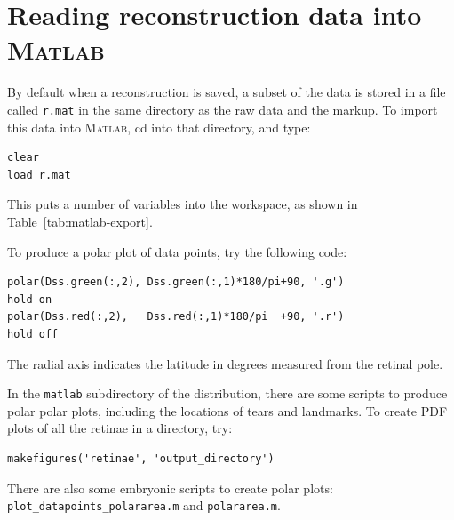 \documentclass{book}
\begin{document}
\section{Reading reconstruction data into \textsc{Matlab}}
\label{retistruct-manual:sec:export-reconstr-data}

By default when a reconstruction is saved, a subset of the data is
stored in a file called \texttt{r.mat} in the same directory as the
raw data and the markup. To import this data into \textsc{Matlab}, cd
into that directory, and type:
\begin{verbatim}
clear
load r.mat
\end{verbatim}
This puts a number of variables into the workspace, as shown in
Table~\ref{tab:matlab-export}.

To produce a polar plot of data points, try the following code:
\begin{verbatim}
polar(Dss.green(:,2), Dss.green(:,1)*180/pi+90, '.g')
hold on
polar(Dss.red(:,2),   Dss.red(:,1)*180/pi  +90, '.r')
hold off
\end{verbatim}
The radial axis indicates the latitude in degrees measured from the
retinal pole.

In the \texttt{matlab} subdirectory of the distribution, there are
some scripts to produce polar polar plots, including the locations of
tears and landmarks. To create PDF plots of all the retinae in a
directory, try:
\begin{verbatim}
makefigures('retinae', 'output_directory')
\end{verbatim}

There are also some embryonic scripts to create polar plots:
\texttt{plot\_datapoints\_polararea.m} and \texttt{polararea.m}.
\end{document}
